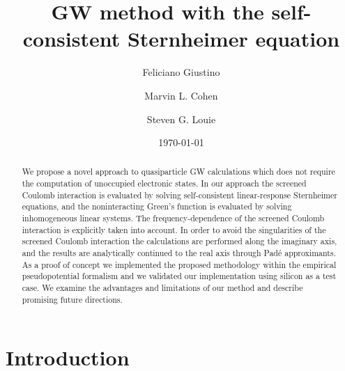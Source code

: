 \documentclass[twocolumn,prb,showpacs,superscriptaddress]{revtex4}
\begin{document}
\title{GW method with the self-consistent Sternheimer equation}

\author{Feliciano Giustino}
\author{Marvin L. Cohen}
\author{Steven G. Louie}
\date{\today}

\begin{abstract}
We propose a novel approach to quasiparticle GW calculations which 
does not require the computation of unoccupied electronic states. 
In our approach the screened Coulomb interaction
is evaluated by solving self-consistent linear-response Sternheimer equations,
and the noninteracting Green's function is evaluated by solving inhomogeneous 
linear systems. The frequency-dependence of the screened Coulomb interaction 
is explicitly taken into account. In order to avoid the singularities of the 
screened Coulomb interaction the calculations are performed
along the imaginary axis, and the results are analytically continued 
to the real axis through Pad\'e approximants. As a proof of concept we implemented 
the proposed methodology within the empirical pseudopotential formalism and 
we validated our implementation using silicon as a test case. We examine 
the advantages and limitations of our method and describe promising future directions.
\end{abstract}


\maketitle

\section{Introduction}
\end{document}
